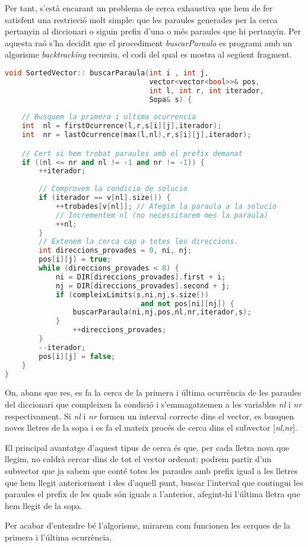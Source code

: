 \documentclass[titlepage]{article}
\begin{document}
Per tant, s'està encarant un problema de cerca exhaustiva que hem de fer satisfent una restricció molt simple: que les paraules generades per la cerca pertanyin al diccionari o siguin prefix d'una o més paraules que hi pertanyin. Per aquesta raó s'ha decidit que el procediment \textit{buscarParaula} es programi amb un algorisme \textit{backtracking} recursiu, el codi del qual  es mostra al següent fragment.\newline

\begin{lstlisting}[language=C++]
void SortedVector:: buscarParaula(int i , int j, 
                                  vector<vector<bool>>& pos,
                                  int l, int r, int iterador,
                                  Sopa& s) {
    
    // Busquem la primera i ultima ocurrencia
    int  nl = firstOcurrence(l,r,s[i][j],iterador);
    int  nr = lastOcurrence(max(l,nl),r,s[i][j],iterador);

    // Cert si hem trobat paraules amb el prefix demanat
    if ((nl <= nr and nl != -1 and nr != -1)) {
        ++iterador;
        
        // Comprovem la condicio de solucio
        if (iterador == v[nl].size()) { 
            ++trobades[v[nl]]; // Afegim la paraula a la solucio
            // Incrementem nl (no necessitarem mes la paraula)
            ++nl; 
        }
        // Extenem la cerca cap a totes les direccions.
        int direccions_provades = 0, ni, nj;
        pos[i][j] = true;
        while (direccions_provades < 8) {
            ni = DIR[direccions_provades].first + i;
            nj = DIR[direccions_provades].second + j; 
            if (compleixLimits(s,ni,nj,s.size()) 
                                and not pos[ni][nj]) {
                buscarParaula(ni,nj,pos,nl,nr,iterador,s);
            }
                ++direccions_provades;
        }
        --iterador;
        pos[i][j] = false;
    }
}    
\end{lstlisting}


On, abans que res, es fa la cerca de la primera i última ocurrència de les paraules del diccionari que compleixen la condició i s'emmagatzemen a les variables \textit{nl} i \textit{nr} respectivament. Si \textit{nl} i \textit{nr} formen un interval correcte dins el vector, es busquen noves lletres de la sopa i es fa el mateix procés de cerca dins el subvector [\textit{nl},\textit{nr}].\newline\par 
El principal avantatge d'aquest tipus de cerca és que, per cada lletra nova que llegim, no caldrà cercar dins de tot el vector ordenat: podrem partir d'un subvector que ja sabem que conté totes les paraules amb prefix igual a les lletres que hem llegit anteriorment i des d'aquell punt, buscar l'interval que contingui les paraules el prefix de les quals són iguals a l'anterior, afegint-hi l'última lletra que hem llegit de la sopa.\newline\par
Per acabar d'entendre bé l'algorisme, mirarem com funcionen les cerques de la primera i l'última ocurrència.
\end{document}

